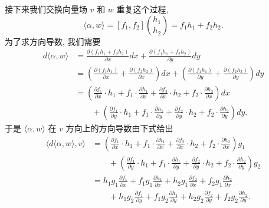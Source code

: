 接下来我们交换向量场 $v$ 和 $w$ 重复这个过程, 
\[
\langle\alpha,w\rangle=[f_1,f_2]\binom{h_1}{h_2}=f_1h_1+f_2h_2.
\]
为了求方向导数, 我们需要
\begin{align*}
d\langle\alpha,w\rangle&=\frac{\partial(f_1h_1+f_2h_2)}{\partial x}dx+\frac{\partial(f_1h_1+f_2h_2)}{\partial y}dy\\
&=\left(\frac{\partial(f_1h_1)}{\partial x}+\frac{\partial(f_2h_2)}{\partial x}\right)dx
+\left(\frac{\partial(f_1h_1)}{\partial y}+\frac{\partial(f_2h_2)}{\partial y}\right)dy\\
&=\left(\frac{\partial f_1}{\partial x}\cdot h_1+f_1\cdot\frac{\partial h_1}{\partial x}
+\frac{\partial f_2}{\partial x}\cdot h_2+f_2\cdot\frac{\partial h_2}{\partial x}\right)dx\\
&\qquad+\left(\frac{\partial f_1}{\partial y}\cdot h_1+f_1\cdot\frac{\partial h_1}{\partial y}
+\frac{\partial f_2}{\partial y}\cdot h_2+f_2\cdot\frac{\partial h_2}{\partial y}\right)dy.
\end{align*}
于是 $\langle\alpha,w\rangle$ 在 $v$ 方向上的方向导数由下式给出
\begin{align*}
\bigl\langle d\langle\alpha,w\rangle,v\bigr\rangle
&=\left(\frac{\partial f_1}{\partial x}\cdot h_1+f_1\cdot\frac{\partial h_1}{\partial x}
+\frac{\partial f_2}{\partial x}\cdot h_2+f_2\cdot\frac{\partial h_2}{\partial x}\right)g_1\\
&\qquad+\left(\frac{\partial f_1}{\partial y}\cdot h_1+f_1\cdot\frac{\partial h_1}{\partial y}
+\frac{\partial f_2}{\partial y}\cdot h_2+f_2\cdot\frac{\partial h_2}{\partial y}\right)g_2\\
&=h_1g_1\frac{\partial f_1}{\partial x}+f_1g_1\frac{\partial h_1}{\partial x}
+h_2g_1\frac{\partial f_2}{\partial x}+f_2g_1\frac{\partial h_2}{\partial x}\\
&\qquad+h_1g_2\frac{\partial f_1}{\partial y}+f_1g_2\frac{\partial h_1}{\partial y}
+h_2g_2\frac{\partial f_2}{\partial y}+f_2g_2\frac{\partial h_2}{\partial y}.
\end{align*}

